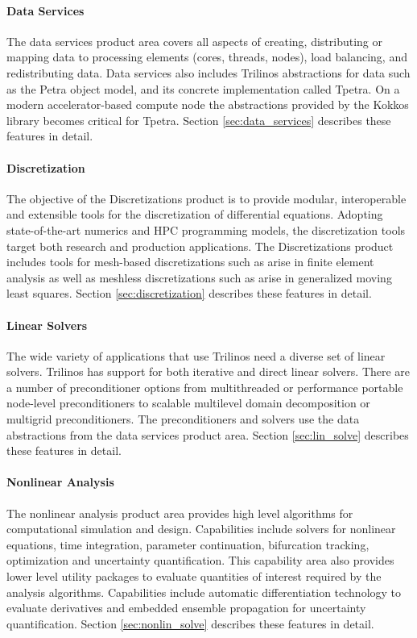 \paragraph{Data Services} The data services product area covers all aspects of creating, distributing or mapping data to processing elements (cores, threads, nodes), load balancing, and redistributing data. Data services also includes Trilinos abstractions for data such as the Petra object model, and its concrete implementation called Tpetra. On a modern accelerator-based compute node the abstractions provided by the Kokkos library becomes critical for Tpetra. Section \ref{sec:data_services} describes these features in detail.
 
\paragraph{Discretization} The objective of the Discretizations product is to provide modular, interoperable and extensible tools for the discretization of differential equations. Adopting state-of-the-art numerics and HPC programming models, the discretization tools target both research and production applications. The Discretizations product includes tools for mesh-based discretizations such as arise in finite element analysis as well as meshless discretizations such as arise in generalized moving least squares. Section \ref{sec:discretization} describes these features in detail.

\paragraph{Linear Solvers} The wide variety of applications that use Trilinos need a diverse set of linear solvers. Trilinos has support for both iterative and direct linear solvers. There are a number of preconditioner options from multithreaded or performance portable node-level preconditioners to scalable multilevel domain decomposition or multigrid preconditioners. The preconditioners and solvers use the data abstractions from the data services product area. Section \ref{sec:lin_solve} describes these features in detail.

\paragraph{Nonlinear Analysis} The nonlinear analysis product area provides high level algorithms for computational simulation and design. Capabilities include solvers for nonlinear equations, time integration, parameter continuation, bifurcation tracking, optimization and uncertainty quantification. This capability area also provides lower level utility packages to evaluate quantities of interest required by the analysis algorithms. Capabilities include automatic differentiation technology to evaluate derivatives and embedded ensemble propagation for uncertainty quantification. Section \ref{sec:nonlin_solve} describes these features in detail.

